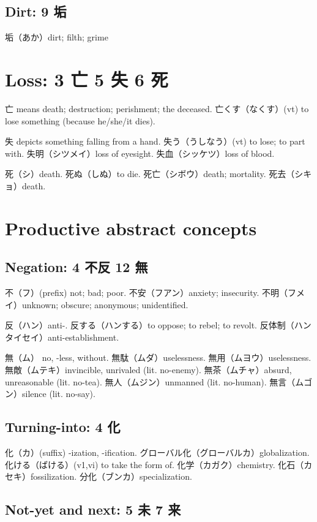 \subsection{Dirt: 9 垢}

垢（あか）dirt; filth; grime

\section{Loss: 3 亡 5 失 6 死}

亡 means death; destruction; perishment; the deceased.
亡くす（なくす）(vt) to lose something (because he/she/it dies).

失 depicts something falling from a hand.
失う（うしなう）(vt) to lose; to part with.
失明（シツメイ）loss of eyesight.
失血（シッケツ）loss of blood.

死（シ）death.
死ぬ（しぬ）to die.
死亡（シボウ）death; mortality.
死去（シキョ）death.

\section{Productive abstract concepts}

\subsection{Negation: 4 不反 12 無}

不（フ）(prefix) not; bad; poor.
不安（フアン）anxiety; insecurity.
不明（フメイ）unknown; obscure; anonymous; unidentified.

反（ハン）anti-.
反する（ハンする）to oppose; to rebel; to revolt.
反体制（ハンタイセイ）anti-establishment.

無（ム） no, -less, without.
無駄（ムダ）uselessness.
無用（ムヨウ）uselessness.
無敵（ムテキ）invincible, unrivaled (lit. no-enemy).
無茶（ムチャ）absurd, unreasonable (lit. no-tea).
無人（ムジン）unmanned (lit. no-human).
無言（ムゴン）silence (lit. no-say).

\subsection{Turning-into: 4 化}

化（カ）(suffix) -ization, -ification.
グローバル化（グローバルカ）globalization.
化ける（ばける）(v1,vi) to take the form of.
化学（カガク）chemistry.
化石（カセキ）fossilization.
分化（ブンカ）specialization.

\subsection{Not-yet and next: 5 未 7 来}

